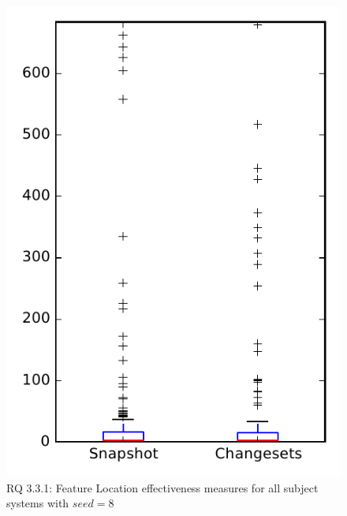 
\begin{figure}
\centering
\includegraphics[height=0.4\textheight]{figures/flt_seed/rq1_overview_8}
\caption{RQ 3.3.1: Feature Location effectiveness measures for all subject systems with $seed=8$}
\label{fig:flt_seed:rq1:overview}
\end{figure}
